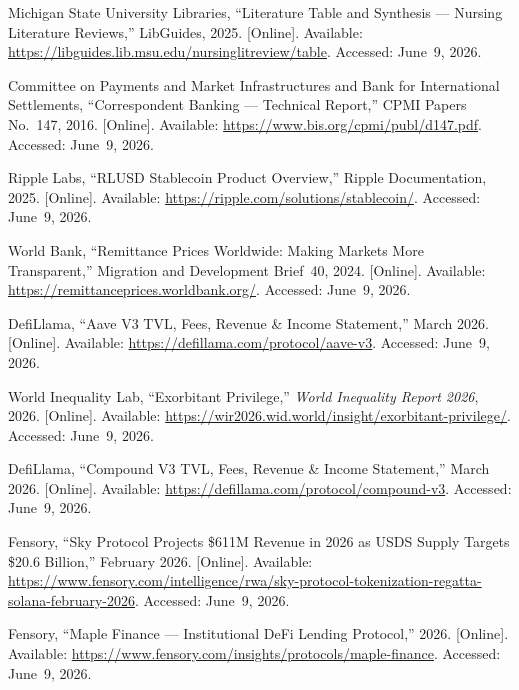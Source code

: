 \documentclass[12pt, a4paper]{report}
\begin{document}
{\begin{enumerate}[label={[\arabic*]}]
\item Michigan State University Libraries, ``Literature Table and Synthesis --- Nursing Literature Reviews,'' LibGuides, 2025. [Online]. Available: \url{https://libguides.lib.msu.edu/nursinglitreview/table}. Accessed: June~9, 2026.

\item Committee on Payments and Market Infrastructures and Bank for International Settlements, ``Correspondent Banking --- Technical Report,'' CPMI Papers No.~147, 2016. [Online]. Available: \url{https://www.bis.org/cpmi/publ/d147.pdf}. Accessed: June~9, 2026.

\item Ripple Labs, ``RLUSD Stablecoin Product Overview,'' Ripple Documentation, 2025. [Online]. Available: \url{https://ripple.com/solutions/stablecoin/}. Accessed: June~9, 2026.

\item World Bank, ``Remittance Prices Worldwide: Making Markets More Transparent,'' Migration and Development Brief~40, 2024. [Online]. Available: \url{https://remittanceprices.worldbank.org/}. Accessed: June~9, 2026.

\item DefiLlama, ``Aave V3 TVL, Fees, Revenue \& Income Statement,'' March 2026. [Online]. Available: \url{https://defillama.com/protocol/aave-v3}. Accessed: June~9, 2026.

\item World Inequality Lab, ``Exorbitant Privilege,'' \textit{World Inequality Report 2026}, 2026. [Online]. Available: \url{https://wir2026.wid.world/insight/exorbitant-privilege/}. Accessed: June~9, 2026.

\item DefiLlama, ``Compound V3 TVL, Fees, Revenue \& Income Statement,'' March 2026. [Online]. Available: \url{https://defillama.com/protocol/compound-v3}. Accessed: June~9, 2026.

\item Fensory, ``Sky Protocol Projects \$611M Revenue in 2026 as USDS Supply Targets \$20.6 Billion,'' February 2026. [Online]. Available: \url{https://www.fensory.com/intelligence/rwa/sky-protocol-tokenization-regatta-solana-february-2026}. Accessed: June~9, 2026.

\item Fensory, ``Maple Finance --- Institutional DeFi Lending Protocol,'' 2026. [Online]. Available: \url{https://www.fensory.com/insights/protocols/maple-finance}. Accessed: June~9, 2026.


\end{enumerate}}
\end{document}
